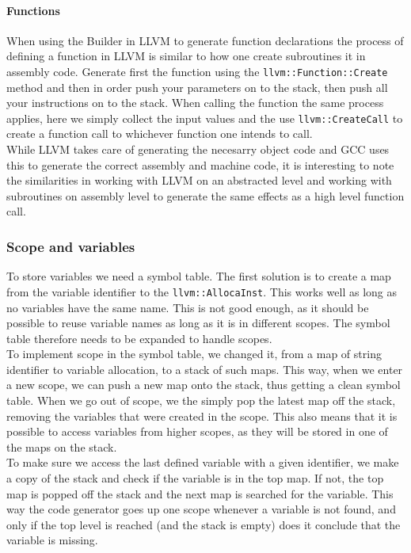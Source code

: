 \paragraph*{Functions}

When using the Builder in LLVM to generate function declarations the process of
defining a function in LLVM is similar to how one create subroutines it in assembly
code. Generate first the function using the \texttt{llvm::Function::Create} method and then in
order push your parameters on to the stack, then push all your instructions on to the
stack. When calling the function the same process applies, here we simply collect the
input values and the use \texttt{llvm::CreateCall} to create a function call to whichever
function one intends to call. \\

While LLVM takes care of generating the necesarry object code and GCC uses this to
generate the correct assembly and machine code, it is interesting to note the
similarities in working with LLVM on an abstracted level and working with subroutines on
assembly level to generate the same effects as a high level function call.


\subsubsection{Scope and variables}
To store variables we need a symbol table. The first solution is to create a map from
the variable identifier to the \texttt{llvm::AllocaInst}. This works well as long as
no variables have the same name. This is not good enough, as it should be possible to
reuse variable names as long as it is in different scopes. The symbol table therefore
needs to be expanded to handle scopes.\\ 

To implement scope in the symbol table, we changed it, from a map of string
identifier to variable allocation, to a stack of such maps. This way, when we enter a
new scope, we can push a new map onto the stack, thus getting a clean symbol table.
When we go out of scope, we the simply pop the latest map off the stack, removing the
variables that were created in the scope. This also means that it is possible to
access variables from higher scopes, as they will be stored in one of the maps on the
stack.\\

To make sure we access the last defined variable with a given identifier, we make a
copy of the stack and check if the variable is in the top map. If not, the top map
is popped off the stack and the next map is searched for the variable. This way the
code generator goes up one scope whenever a variable is not found, and only if the
top level is reached (and the stack is empty) does it conclude that the variable is
missing.

